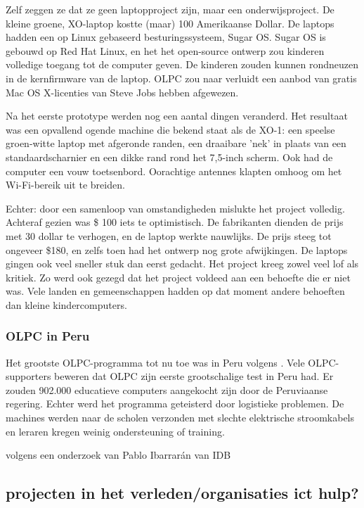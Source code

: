 Zelf zeggen ze dat ze geen laptopproject zijn, maar een onderwijsproject. De kleine groene, XO-laptop kostte (maar) 100 Amerikaanse Dollar. De laptops hadden een op Linux gebaseerd besturingssysteem, Sugar OS. Sugar OS is gebouwd op Red Hat Linux, en het het open-source ontwerp zou kinderen volledige toegang tot de computer geven. De kinderen zouden kunnen rondneuzen in de kernfirmware van de laptop. OLPC zou naar verluidt een aanbod van gratis Mac OS X-licenties van Steve Jobs hebben afgewezen. \autocite{Robertson2018}

Na het eerste prototype werden nog een aantal dingen veranderd. Het resultaat was een opvallend ogende machine die bekend staat als de XO-1: een speelse groen-witte laptop met afgeronde randen, een draaibare 'nek' in plaats van een standaardscharnier en een dikke rand rond het 7,5-inch scherm. Ook had de computer een vouw toetsenbord. Oorachtige antennes klapten omhoog om het Wi-Fi-bereik uit te breiden. \autocite{Robertson2018}

Echter: door een samenloop van omstandigheden mislukte het project volledig. Achteraf gezien was \$ 100 iets te optimistisch. De fabrikanten dienden de prijs met 30 dollar te verhogen, en de laptop werkte nauwlijks. De prijs steeg tot ongeveer \$180, en zelfs toen had het ontwerp nog grote afwijkingen. De laptops gingen ook veel sneller stuk dan eerst gedacht. Het project kreeg zowel veel lof als kritiek. Zo werd ook gezegd dat het project voldeed aan een behoefte die er niet was. Vele landen en gemeenschappen hadden op dat moment andere behoeften dan kleine kindercomputers. \autocite{Robertson2018}

\subsubsection{OLPC in Peru}
Het grootste OLPC-programma tot nu toe was in Peru volgens \autocite{Trucano2012}. Vele OLPC-supporters beweren dat OLPC zijn eerste grootschalige test in Peru had. Er zouden 902.000 educatieve computers aangekocht zijn door de Peruviaanse regering. Echter werd het programma  geteisterd door logistieke problemen. De machines werden naar de scholen verzonden met slechte elektrische stroomkabels en leraren kregen weinig ondersteuning of training. \autocite{Robertson2018}

 volgens een onderzoek van Pablo Ibarrarán van IDB
\autocite{Ibarraran2012}



\subsection{projecten in het verleden/organisaties ict hulp?}


